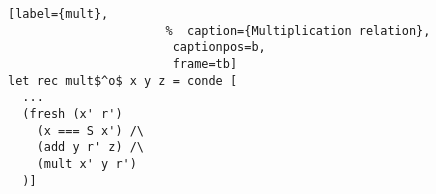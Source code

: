 \begin{figure}[!t]
  \centering
  \begin{minipage}{\columnwidth}
    \begin{lstlisting}[label={mult},
                      %  caption={Multiplication relation},
                       captionpos=b,
                       frame=tb]
let rec mult$^o$ x y z = conde [
  ...
  (fresh (x' r')
    (x === S x') /\
    (add y r' z) /\
    (mult x' y r')
  )]
    \end{lstlisting}
  \end{minipage}
\end{figure}
